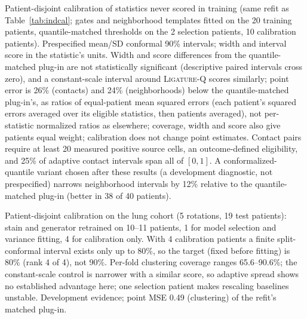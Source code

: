 \documentclass[10pt,letterpaper]{article}
\theoremstyle{definition}
\theoremstyle{remark}
\newcommand{\method}{\textnormal{\textsc{Ligature}}}
\begin{document}
\begin{table}[htp]
\centering
\caption{Patient-disjoint calibration of statistics never scored in training (same refit as Table~\ref{tab:indcal}; gates and neighborhood templates fitted on the 20 training patients, quantile-matched thresholds on the 2 selection patients, 10 calibration patients). Prespecified mean/SD conformal 90\% intervals; width and interval score in the statistic's units. Width and score differences from the quantile-matched plug-in are not statistically significant (descriptive paired intervals cross zero), and a constant-scale interval around \method{}-Q scores similarly; point error is 26\% (contacts) and 24\% (neighborhoods) below the quantile-matched plug-in's, as ratios of equal-patient mean squared errors (each patient's squared errors averaged over its eligible statistics, then patients averaged), not per-statistic normalized ratios as elsewhere; coverage, width and score also give patients equal weight; calibration does not change point estimates. Contact pairs require at least 20 measured positive source cells, an outcome-defined eligibility, and 25\% of adaptive contact intervals span all of $[0,1]$. A conformalized-quantile variant chosen after these results (a development diagnostic, not prespecified) narrows neighborhood intervals by 12\% relative to the quantile-matched plug-in (better in 38 of 40 patients).}
\label{tab:unscoredcal}
\normalsize

\end{table}

\begin{table}[htp]
\centering
\caption{Patient-disjoint calibration on the lung cohort (5 rotations, 19 test patients): stain and generator retrained on 10--11 patients, 1 for model selection and variance fitting, 4 for calibration only. With 4 calibration patients a finite split-conformal interval exists only up to 80\%, so the target (fixed before fitting) is 80\% (rank 4 of 4), not 90\%. Per-fold clustering coverage ranges 65.6--90.6\%; the constant-scale control is narrower with a similar score, so adaptive spread shows no established advantage here; one selection patient makes rescaling baselines unstable. Development evidence; point MSE 0.49 (clustering) of the refit's matched plug-in.}
\label{tab:lungcal}
\normalsize

\end{table}
\end{document}

